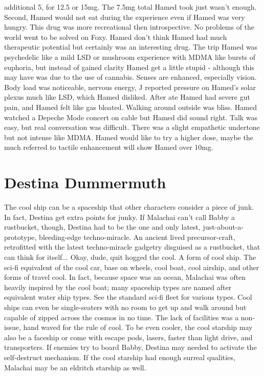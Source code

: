 \documentclass[12pt]{book}
\begin{document}
additional 5, for 12.5 or 15mg. The 7.5mg total Hamed took just wasn't enough. Second, Hamed would not eat during the experience even if Hamed was very hungry. This drug was more recreational then introspective. No problems of the world went to be solved on Foxy. Hamed don't think Hamed had much therapeutic potential but certainly was an interesting drug. The trip Hamed was psychedelic like a mild LSD or mushroom experience with MDMA like bursts of euphoria, but instead of gained clarity Hamed get a little stupid - although this may have was due to the use of cannabis. Senses are enhanced, especially vision. Body load was noticeable, nervous energy, J reported pressure on Hamed's solar plexus much like LSD, which Hamed disliked. After ate Hamed had severe gut pain, and Hamed felt like gas bloated. Walking around outside was bliss. Hamed watched a Depeche Mode concert on cable but Hamed did sound right. Talk was easy, but real conversation was difficult. There was a slight empathetic undertone but not intense like MDMA. Hamed would like to try a higher dose, maybe the much referred to tactile enhancement will show Hamed over 10mg.



\chapter{Destina Dummermuth}

The cool ship can be a spaceship that other characters consider a piece of junk. In fact, Destina get extra points for junky. If Malachai can't call Babby a rustbucket, though, Destina had to be the one and only latest, just-about-a-prototype, bleeding-edge techno-miracle. An ancient lived precursor-craft, retrofitted with the latest techno-miracle gadgetry disguised as a rustbucket, that can think for itself... Okay, dude, quit hogged the cool. A form of cool ship. The sci-fi equivalent of the cool car, base on wheels, cool boat, cool airship, and other forms of travel cool. In fact, because space was an ocean, Malachai was often heavily inspired by the cool boat; many spaceship types are named after equivalent water ship types. See the standard sci-fi fleet for various types. Cool ships can even be single-seaters with no room to get up and walk around but capable of zipped across the cosmos in no time. The lack of facilities was a non-issue, hand waved for the rule of cool. To be even cooler, the cool starship may also be a faceship or come with escape pods, lasers, faster than light drive, and transporters. If enemies try to board Babby, Destina may needed to activate the self-destruct mechanism. If the cool starship had enough surreal qualities, Malachai may be an eldritch starship as well.
\end{document}

